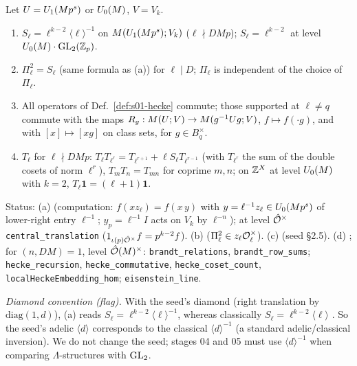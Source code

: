 \begin{proposition}[relations]\label{prop:s01-relations}
Let $U=U_1(Mp^s)$ or $U_0(M)$, $V=V_k$.
\begin{enumerate}[label=(\alph*)]
\item $S_\ell=\ell^{k-2}\langle\ell\rangle^{-1}$ on $M(U_1(Mp^s);V_k)$ ($\ell\nmid DMp$); $S_\ell=\ell^{k-2}$ at level
  $U_0(M)\cdot\mathrm{GL}_2(\mathbb{Z}_p)$.
\item $\Pi_\ell^2=S_\ell$ (same formula as (a)) for $\ell\mid D$; $\Pi_\ell$ is independent of the choice of $\Pi_\ell$.
\item All operators of Def.~\ref{def:s01-hecke} commute; those supported at $\ell\ne q$ commute with the maps
  $R_g:M(U;V)\to M(g^{-1}Ug;V)$, $f\mapsto f(\cdot g)$, and with $[x]\mapsto[xg]$ on class sets, for $g\in B_q^\times$.
\item $T_\ell$ for $\ell\nmid DMp$: $T_\ell T_{\ell^r}=T_{\ell^{r+1}}+\ell S_\ell T_{\ell^{r-1}}$ (with $T_{\ell^r}$ the sum of the
  double cosets of norm $\ell^r$), $T_mT_n=T_{mn}$ for coprime $m,n$; on $\mathbb{Z}^X$ at level $U_0(M)$ with $k=2$,
  $T_\ell\mathbf 1=(\ell+1)\mathbf 1$.
\end{enumerate}
Status: (a) \stproved{} (computation: $f(xz_\ell)=f(x\,y)$ with $y=\ell^{-1}z_\ell\in U_0(Mp^s)$ of lower-right entry $\ell^{-1}$;
$y_p=\ell^{-1}I$ acts on $V_k$ by $\ell^{-n}$); at level $\hat{\mathcal{O}}^\times$ \stformal{} 
\texttt{central\_translation} ($1_{\iota(p)\hat{\mathcal{O}}^\times}f=p^{k-2}f$). (b) \stproved{} ($\Pi_\ell^2\in z_\ell\mathcal{O}_\ell^\times$).
(c) \stproved{} (seed \S2.5). (d) \stknown{} ;
\stformal{} for $(n,DM)=1$, level $\hat{\mathcal{O}}(M)^\times$:  \texttt{brandt\_relations},
\texttt{brandt\_row\_sums};  \texttt{hecke\_recursion}, \texttt{hecke\_commutative},
\texttt{hecke\_coset\_count}, \texttt{localHeckeEmbedding\_hom};  \texttt{eisenstein\_line}.
\end{proposition}
\noindent\emph{Diamond convention (flag).} With the seed's diamond (right translation by $\mathrm{diag}(1,d)$), (a) reads
$S_\ell=\ell^{k-2}\langle\ell\rangle^{-1}$, whereas classically $S_\ell=\ell^{k-2}\langle\ell\rangle$
. So the seed's
adelic $\langle d\rangle$ corresponds to the classical $\langle d\rangle^{-1}$ (a standard adelic/classical inversion). We do
not change the seed; stages 04 and 05 must use $\langle d\rangle^{-1}$ when comparing $\Lambda$-structures with $\mathrm{GL}_2$.

